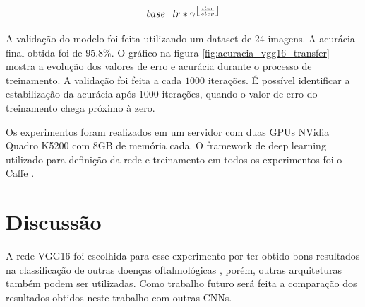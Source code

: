 \documentclass[conference]{IEEEtran}
\DeclarePairedDelimiter\floor{\lfloor}{\rfloor}
\begin{document}
  \begin{equation}
    base\_lr * \gamma^{\floor*{\frac{iter}{step}}}
    \label{eq:learning_rate}
  \end{equation}


  A validação do modelo foi feita utilizando um dataset de 24 imagens. A acurácia final obtida foi de $95.8\%$. O gráfico na figura \ref{fig:acuracia_vgg16_transfer} mostra a evolução dos valores de erro e acurácia durante o processo de treinamento. A validação foi feita a cada $1000$ iterações. É possível identificar a estabilização da acurácia após $1000$ iterações, quando o valor de erro do treinamento chega próximo à zero.



  Os experimentos foram realizados em um servidor com duas GPUs NVidia Quadro K5200 com 8GB de memória cada. O framework de deep learning utilizado para definição da rede e treinamento em todos os experimentos foi o Caffe \cite{jia2014caffe}.

\section{Discussão}


A rede VGG16 foi escolhida para esse experimento por ter obtido bons resultados na classificação de outras doenças oftalmológicas \cite{li2017, lee2017}, porém, outras arquiteturas também podem ser utilizadas. Como trabalho futuro será feita a comparação dos resultados obtidos neste trabalho com outras CNNs.
\end{document}
